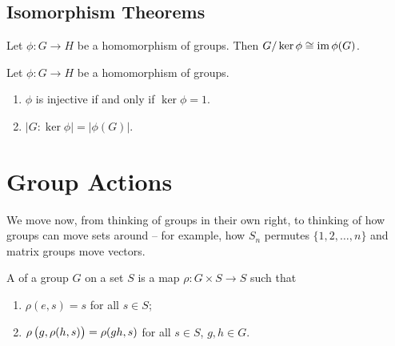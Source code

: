 \subsection{Isomorphism Theorems}
\begin{theorem}
Let $\phi:G\to H$ be a homomorphism of groups. Then $G/\ker\phi\cong\operatorname{im}\phi(G)$.
\end{theorem}

\begin{corollary}
Let $\phi:G\to H$ be a homomorphism of groups.
\begin{enumerate}[label=(\roman*)]
\item $\phi$ is injective if and only if $\ker\phi=1$.
\item $|G:\ker\phi|=|\phi(G)|$.
\end{enumerate}
\end{corollary}

\begin{theorem}

\end{theorem}

\begin{theorem}

\end{theorem}

\begin{theorem}

\end{theorem}

\section{Group Actions}
We move now, from thinking of groups in their own right, to thinking of how groups can move sets around -- for example, how $S_n$ permutes $\{1,2,\dots,n\}$ and matrix groups move vectors.

\begin{definition}
A  of a group $G$ on a set $S$ is a map $\rho:G\times S\to S$ such that
\begin{enumerate}[label=(\roman*)]
\item $\rho(e,s)=s$ for all $s\in S$;
\item $\rho\left(g,\rho(h,s)\right)=\rho(gh,s)$ for all $s\in S$, $g,h\in G$.
\end{enumerate}
\end{definition}

